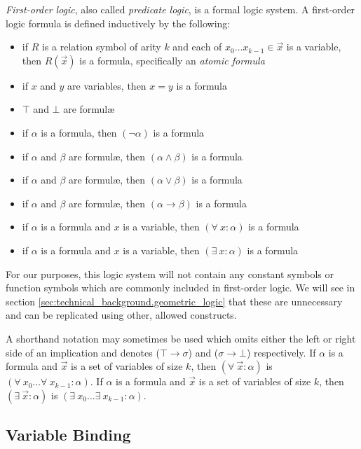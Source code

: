 		\emph{First-order logic}, also called \emph{predicate logic}, is a
		formal logic system. A first-order logic formula is defined inductively
		by the following:
		\begin{itemize}
		\item if $R$ is a relation symbol of arity $k$ and each of $x_0 \ldots x_{k-1} \in \vec{x}$ is a variable, then $R(\vec{x})$ is a formula, specifically an \emph{atomic formula}
		\item if $x$ and $y$ are variables, then $x = y$ is a formula
		\item $\top$ and $\bot$ are formul{\ae}
		\item if $\alpha$ is a formula, then $(\neg\alpha)$ is a formula
		\item if $\alpha$ and $\beta$ are formul{\ae}, then $(\alpha \wedge \beta)$ is a formula
		\item if $\alpha$ and $\beta$ are formul{\ae}, then $(\alpha \vee \beta)$ is a formula
		\item if $\alpha$ and $\beta$ are formul{\ae}, then $(\alpha \to \beta)$ is a formula
		\item if $\alpha$ is a formula and $x$ is a variable, then $(\forall\ x : \alpha)$ is a formula
		\item if $\alpha$ is a formula and $x$ is a variable, then $(\exists\ x : \alpha)$ is a formula
		\end{itemize}

		For our purposes, this logic system will not contain any constant
		symbols or function symbols which are commonly included in first-order
		logic. We will see in section
		\ref{sec:technical_background.geometric_logic} that these are
		unnecessary and can be replicated using other, allowed constructs.

		A shorthand notation may sometimes be used which omits either the left
		or right side of an implication and denotes ($\top \to \sigma$) and
		($\sigma \to \bot$) respectively. If $\alpha$ is a formula and
		$\vec{x}$ is a set of variables of size $k$, then $(\forall\ \vec{x} :
		\alpha)$ is $(\forall\ x_0 \ldots \forall\ x_{k-1} : \alpha)$. If
		$\alpha$ is a formula and $\vec{x}$ is a set of variables of size $k$,
		then $(\exists\ \vec{x} : \alpha)$ is $(\exists\ x_0 \ldots \exists\
		x_{k-1} : \alpha)$.

	\subsection{Variable Binding}

